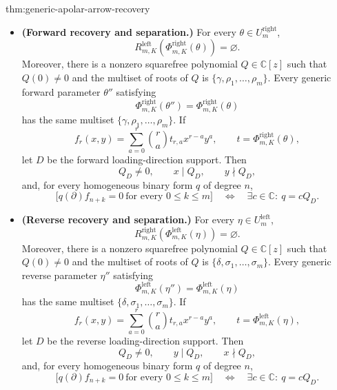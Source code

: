 \begin{theoremv}{thm:generic-apolar-arrow-recovery}
\begin{itemize}
\item \textbf{(Forward recovery and separation.)} For every \(\theta\in U_m^{\mathrm{right}}\),
\[
R^{\mathrm{left}}_{m,K}\!\left(\Phi^{\mathrm{right}}_{m,K}(\theta)\right)=\varnothing.
\]
Moreover, there is a nonzero squarefree polynomial \(Q\in\mathbb C[z]\) such that
\(Q(0)\neq0\) and the multiset of roots of \(Q\) is
\(\{\gamma,\rho_1,\ldots,\rho_m\}\). Every generic forward parameter \(\theta''\) satisfying
\[
\Phi^{\mathrm{right}}_{m,K}(\theta'')=
\Phi^{\mathrm{right}}_{m,K}(\theta)
\]
has the same multiset \(\{\gamma,\rho_1,\ldots,\rho_m\}\).  If
\[
f_r(x,y)=\sum_{a=0}^{r}\binom{r}{a}t_{r,a}x^{r-a}y^a,
\qquad
t=\Phi^{\mathrm{right}}_{m,K}(\theta),
\]
let \(D\) be the forward loading-direction support. Then
\[
Q_D\neq0,\qquad x\mid Q_D,\qquad y\nmid Q_D,
\]
and, for every homogeneous binary form \(q\) of degree \(n\),
\[
\bigl[q(\partial)f_{n+k}=0\ \text{for every }0\leq k\leq m\bigr]
\quad\Longleftrightarrow\quad
\exists c\in\mathbb C:\ q=cQ_D.
\]

\item \textbf{(Reverse recovery and separation.)} For every \(\eta\in U_m^{\mathrm{left}}\),
\[
R^{\mathrm{right}}_{m,K}\!\left(\Phi^{\mathrm{left}}_{m,K}(\eta)\right)=\varnothing.
\]
Moreover, there is a nonzero squarefree polynomial \(Q\in\mathbb C[z]\) such that
\(Q(0)\neq0\) and the multiset of roots of \(Q\) is
\(\{\delta,\sigma_1,\ldots,\sigma_m\}\). Every generic reverse parameter \(\eta''\) satisfying
\[
\Phi^{\mathrm{left}}_{m,K}(\eta'')=
\Phi^{\mathrm{left}}_{m,K}(\eta)
\]
has the same multiset \(\{\delta,\sigma_1,\ldots,\sigma_m\}\).  If
\[
f_r(x,y)=\sum_{a=0}^{r}\binom{r}{a}t_{r,a}x^{r-a}y^a,
\qquad
t=\Phi^{\mathrm{left}}_{m,K}(\eta),
\]
let \(D\) be the reverse loading-direction support. Then
\[
Q_D\neq0,\qquad y\mid Q_D,\qquad x\nmid Q_D,
\]
and, for every homogeneous binary form \(q\) of degree \(n\),
\[
\bigl[q(\partial)f_{n+k}=0\ \text{for every }0\leq k\leq m\bigr]
\quad\Longleftrightarrow\quad
\exists c\in\mathbb C:\ q=cQ_D.
\]
\end{itemize}
\end{theoremv}
